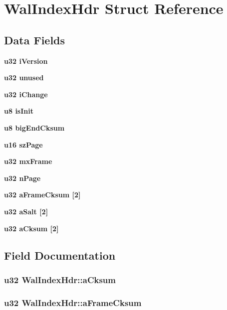 \section{Wal\-Index\-Hdr Struct Reference}
\label{structWalIndexHdr}
\subsection*{Data Fields}
\begin{CompactItemize}
\item 
\bf{u32} \bf{i\-Version}
\item 
\bf{u32} \bf{unused}
\item 
\bf{u32} \bf{i\-Change}
\item 
\bf{u8} \bf{is\-Init}
\item 
\bf{u8} \bf{big\-End\-Cksum}
\item 
\bf{u16} \bf{sz\-Page}
\item 
\bf{u32} \bf{mx\-Frame}
\item 
\bf{u32} \bf{n\-Page}
\item 
\bf{u32} \bf{a\-Frame\-Cksum} [2]
\item 
\bf{u32} \bf{a\-Salt} [2]
\item 
\bf{u32} \bf{a\-Cksum} [2]
\end{CompactItemize}


\subsection{Field Documentation}
\subsubsection{\setlength{\rightskip}{0pt plus 5cm}\bf{u32} \bf{Wal\-Index\-Hdr::a\-Cksum}}\label{structWalIndexHdr_f21c6adde72a80697f237e44a5f6553c}


\subsubsection{\setlength{\rightskip}{0pt plus 5cm}\bf{u32} \bf{Wal\-Index\-Hdr::a\-Frame\-Cksum}}\label{structWalIndexHdr_fe8466ea599514fd4c730fc689220b8e}


